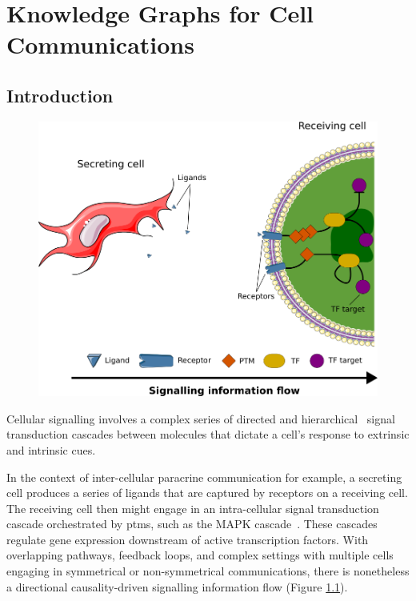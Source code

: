 \chapter{Knowledge Graphs for Cell Communications}
\label{06kg}

\section{Introduction}

\begin{figure}
    \centering
    \includegraphics{06kg/figs/6KG_com.png}
    \caption{}
    \label{fig:6intro}
\end{figure}

Cellular signalling involves a complex series of directed and hierarchical~\cite{kumar_3_2003} signal transduction cascades between molecules that dictate a cell's response to extrinsic and intrinsic cues.

In the context of inter-cellular paracrine communication for example, a secreting cell produces a series of ligands that are captured by receptors on a receiving cell. The receiving cell then might engage in an intra-cellular signal transduction cascade orchestrated by \acrshort{ptm}s, such as the MAPK cascade~\cite{zhang_mapk_2002}. These cascades regulate gene expression downstream of active transcription factors. With overlapping pathways, feedback loops, and complex settings with multiple cells engaging in symmetrical or non-symmetrical communications, there is nonetheless a directional causality-driven signalling information flow (Figure \ref{fig:6intro}).

